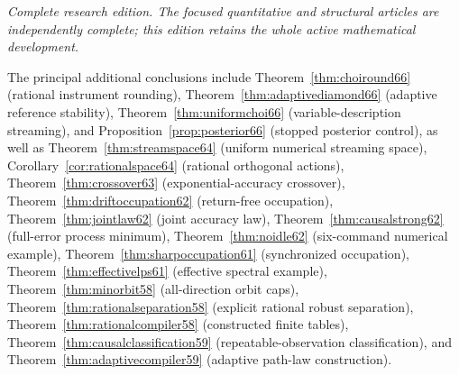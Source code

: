 \documentclass[11pt]{amsart}
\numberwithin{equation}{section}
\theoremstyle{definition}\newtheorem{definition}[theorem]{Definition}
\theoremstyle{remark}\newtheorem{remark}[theorem]{Remark}
\begin{document}
\maketitle
\noindent\textit{Complete research edition. The focused quantitative and structural articles are independently complete; this edition retains the whole active mathematical development.}

\noindent The principal additional conclusions include
Theorem~\ref{thm:choiround66} (rational instrument rounding),
Theorem~\ref{thm:adaptivediamond66} (adaptive reference stability),
Theorem~\ref{thm:uniformchoi66} (variable-description streaming),
and Proposition~\ref{prop:posterior66} (stopped posterior control),
as well as
Theorem~\ref{thm:streamspace64} (uniform numerical streaming space),
Corollary~\ref{cor:rationalspace64} (rational orthogonal actions),
Theorem~\ref{thm:crossover63} (exponential-accuracy crossover),
Theorem~\ref{thm:driftoccupation62} (return-free occupation),
Theorem~\ref{thm:jointlaw62} (joint accuracy law),
Theorem~\ref{thm:causalstrong62} (full-error process minimum),
Theorem~\ref{thm:noidle62} (six-command numerical example),
Theorem~\ref{thm:sharpoccupation61} (synchronized occupation),
Theorem~\ref{thm:effectivelps61} (effective spectral example),
Theorem~\ref{thm:minorbit58} (all-direction orbit caps),
Theorem~\ref{thm:rationalseparation58} (explicit rational robust separation),
Theorem~\ref{thm:rationalcompiler58} (constructed finite tables),
Theorem~\ref{thm:causalclassification59} (repeatable-observation
classification), and Theorem~\ref{thm:adaptivecompiler59} (adaptive
path-law construction).










































\appendix


\end{document}
